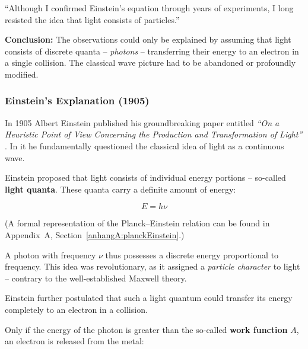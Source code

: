 \vspace{1em}
\begin{tcolorbox}[physikbox, title=Robert A. Millikan (1916)\textit{ \cite{millikan1916}}]
	\label{box:Robert A, Millikan}
	\small
	“Although I confirmed Einstein’s equation through years of experiments, I long resisted the idea that light consists of particles.”
\end{tcolorbox}
\vspace{1em}

\textbf{Conclusion:} The observations could only be explained by assuming that light consists of discrete quanta – \emph{photons} – transferring their energy to an electron in a single collision. The classical wave picture had to be abandoned or profoundly modified.

\subsubsection{Einstein’s Explanation (1905)}

In 1905 Albert Einstein published his groundbreaking paper entitled \textit{“On a Heuristic Point of View Concerning the Production and Transformation of Light”} \cite{einstein1905}. In it he fundamentally questioned the classical idea of light as a continuous wave.

Einstein proposed that light consists of individual energy portions – so-called \textbf{light quanta}. These quanta carry a definite amount of energy:

\[
E = h \nu
\]

(A formal representation of the Planck–Einstein relation can be found in Appendix~A, Section~\ref{anhangA:planckEinstein}.)

A photon with frequency \( \nu \) thus possesses a discrete energy proportional to frequency. This idea was revolutionary, as it assigned a \emph{particle character} to light – contrary to the well-established Maxwell theory.

Einstein further postulated that such a light quantum could transfer its energy completely to an electron in a collision. 

Only if the energy of the photon is greater than the so-called \textbf{work function} \( A \), an electron is released from the metal:

